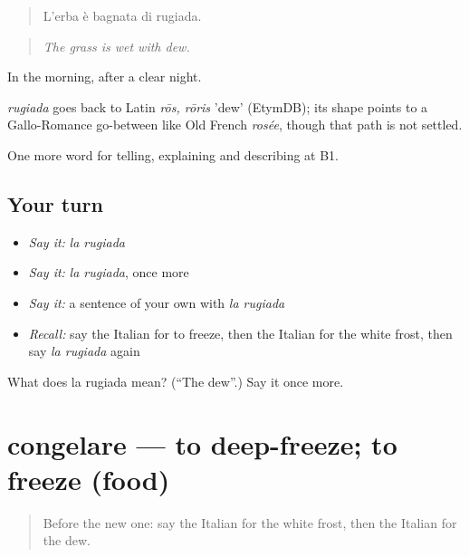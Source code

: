 \begin{quote}
L'erba è bagnata di rugiada.
\end{quote}

\begin{quote}
\emph{The grass is wet with dew.}
\end{quote}

In the morning, after a clear night.

\begin{cousinweb}
\emph{rugiada} goes back to Latin \emph{rōs, rōris} 'dew' (EtymDB); its shape points to a Gallo-Romance go-between like Old French \emph{rosée}, though that path is not settled.
\end{cousinweb}

\begin{grammarlens}[title={What you've built}]
One more word for telling, explaining and describing at B1.
\end{grammarlens}

\subsection*{Your turn}
\begin{itemize}
\raggedright
  \item \emph{Say it:} \emph{la rugiada}
  \item \emph{Say it:} \emph{la rugiada}, once more
  \item \emph{Say it:} a sentence of your own with \emph{la rugiada}
  \item \emph{Recall:} say the Italian for to freeze, then the Italian for the white frost, then say \emph{la rugiada} again
\end{itemize}

\begin{tcolorbox}[breakable,colback=teal!4,colframe=teal!35!black,title={Before you move on}]
What does la rugiada mean? (\textquotedblleft{}The dew\textquotedblright{}.) Say it once more.
\end{tcolorbox}
\section[congelare]{congelare — to deep-freeze; to freeze (food)}

\label{lesson:IT-C468-congelare}



\begin{quote}
Before the new one: say the Italian for the white frost, then the Italian for the dew.
\end{quote}

